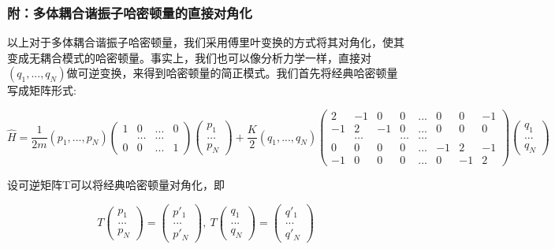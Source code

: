 \subsubsection*{附：多体耦合谐振子哈密顿量的直接对角化}

以上对于多体耦合谐振子哈密顿量，我们采用傅里叶变换的方式将其对角化，使其变成无耦合模式的哈密顿量。事实上，我们也可以像分析力学一样，直接对$(q_1,...,q_N)$做可逆变换，来得到哈密顿量的简正模式。我们首先将经典哈密顿量写成矩阵形式:

\begin{equation}
    \hat{H}=\frac{1}{2m}(p_1,...,p_N)\left(\begin{matrix}
        1 & 0 & ... & 0 \\
         & \dots & \dots \\
        0 & 0 & ... & 1
    \end{matrix}\right) \left(\begin{matrix}
        p_1 \\ \dots \\ p_N
    \end{matrix}\right)
    +\frac{K}{2}(q_1,...,q_N)\left(\begin{matrix}
        2 & -1 & 0 & 0 & ... & 0 & 0 & -1 \\
        -1 & 2 & -1 & 0 & ... & 0 & 0 & 0 \\
         & \dots & & \dots & \dots &  \\
        0 & 0 & 0 & 0 & ... & -1 & 2 & -1 \\
        -1 & 0 & 0 & 0 & ... & 0 & -1 & 2
    \end{matrix}\right) \left(\begin{matrix}
        q_1 \\ ... \\ q_N
    \end{matrix}\right)
\end{equation}

设可逆矩阵T可以将经典哈密顿量对角化，即

\begin{equation}
    T\left(\begin{matrix}
        p_1 \\ ... \\ p_N
    \end{matrix}\right)=\left(\begin{matrix}
        p'_1 \\ ... \\ p'_N
    \end{matrix}\right),\ T\left(\begin{matrix}
        q_1 \\ ... \\ q_N
    \end{matrix}\right)=\left(\begin{matrix}
        q'_1 \\ ... \\ q'_N
    \end{matrix}\right)
\end{equation}

